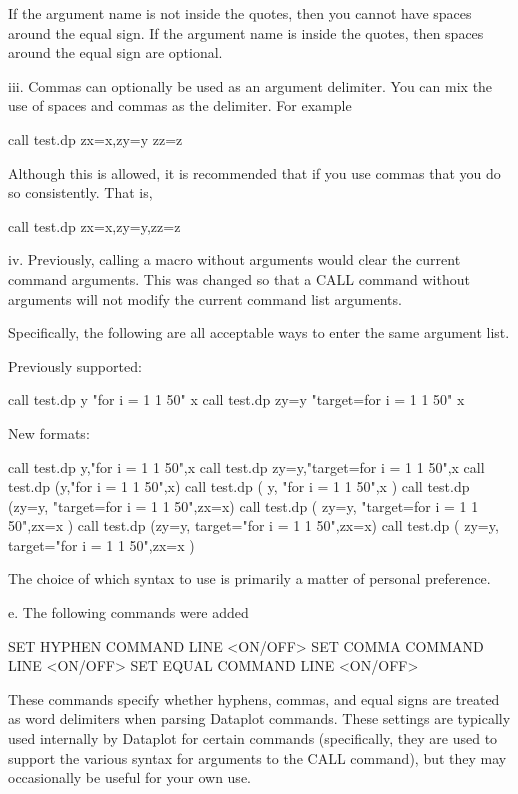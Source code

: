               If the argument name is not inside the quotes, then you
              cannot have spaces around the equal sign.  If the argument
              name is inside the quotes, then spaces around the equal sign
              are optional.

         iii. Commas can optionally be used as an argument delimiter.  You
              can mix the use of spaces and commas as the delimiter.  For
              example

                   call test.dp  zx=x,zy=y  zz=z

              Although this is allowed, it is recommended that if you use
              commas that you do so consistently.  That is,

                   call test.dp  zx=x,zy=y,zz=z

          iv. Previously, calling a macro without arguments would clear
              the current command arguments.  This was changed so that
              a CALL command without arguments will not modify the current
              command list arguments.

       Specifically, the following are all acceptable ways to enter the
       same argument list.

           Previously supported:

              call test.dp  y "for i = 1 1 50" x
              call test.dp  zy=y "target=for i = 1 1 50" x

           New formats:

              call test.dp  y,"for i = 1 1 50",x
              call test.dp  zy=y,"target=for i = 1 1 50",x
              call test.dp  (y,"for i = 1 1 50",x)
              call test.dp  ( y, "for i = 1 1 50",x )
              call test.dp  (zy=y, "target=for i = 1 1 50",zx=x)
              call test.dp  ( zy=y, "target=for i = 1 1 50",zx=x )
              call test.dp  (zy=y, target="for i = 1 1 50",zx=x)
              call test.dp  ( zy=y, target="for i = 1 1 50",zx=x )

       The choice of which syntax to use is primarily a matter of personal
       preference.

    e. The following commands were added

          SET HYPHEN COMMAND LINE <ON/OFF>
          SET COMMA COMMAND LINE  <ON/OFF>
          SET EQUAL COMMAND LINE  <ON/OFF>

       These commands specify whether hyphens, commas, and equal signs
       are treated as word delimiters when parsing Dataplot commands.
       These settings are typically used internally by Dataplot for
       certain commands (specifically, they are used to support the
       various syntax for arguments to the CALL command), but they may
       occasionally be useful for your own use.

